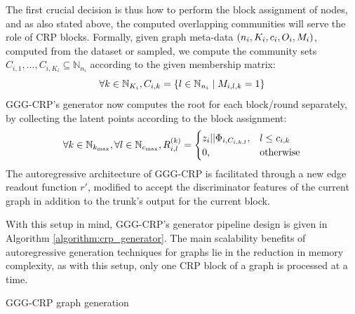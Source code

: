 The first crucial decision is thus how to perform the block assignment of nodes, and as also stated above, the computed overlapping communities will serve the role of CRP blocks. Formally, given graph meta-data $\mathopen{}\left(n_i, K_i, c_i, O_i, M_i\right)$, computed from the dataset or sampled, we compute the community sets $C_{i,1},\dots,C_{i,K_i} \subseteq \mathbb{N}_{n_i}$ according to the given membership matrix: 
\begin{equation}
\forall k \in \mathbb{N}_{K_i},C_{i,k}=\mathopen{}\left\{l \in \mathbb{N}_{n_i} \mid M_{i,l,k} = 1\right\}
\end{equation}
GGG-CRP's generator now computes the root for each block/round separately, by collecting the latent points according to the block assignment:
\begin{equation}
\forall k \in \mathbb{N}_{k_{\max}}, \forall l \in \mathbb{N}_{c_{\max}},
R_{i,l}^{\mathopen{}\left(k\right)} = \begin{cases} z_i||\Phi_{i,C_{i,k,l}}, & l \leq c_{i,k} \\ 0, & \text{otherwise} \end{cases}
\end{equation}
The autoregressive architecture of GGG-CRP is facilitated through a new edge readout function $r'$, modified to accept the discriminator features of the current graph in addition to the trunk's output for the current block. 

With this setup in mind, GGG-CRP's generator pipeline design is given in Algorithm \ref{algorithm:crp_generator}. The main scalability benefits of autoregressive generation techniques for graphs lie in the reduction in memory complexity, as with this setup, only one CRP block of a graph is processed at a time.

\begin{algorithm}%
\caption{GGG-CRP graph generation}
\label{algorithm:crp_generator}
\begin{algorithmic}
\ENDFOR
{}
\end{algorithmic}
\end{algorithm} 

